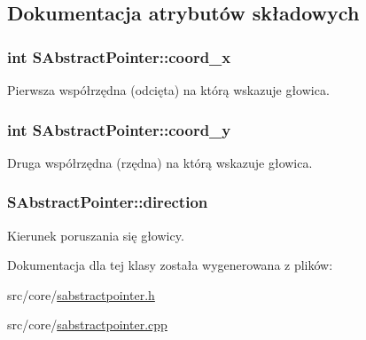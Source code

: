 \subsection{Dokumentacja atrybutów składowych}
\hypertarget{classSAbstractPointer_f4a22efc5fe4922cfe61ac8d849d6849}{
\subsubsection[{coord\_\-x}]{\setlength{\rightskip}{0pt plus 5cm}int {\bf SAbstractPointer::coord\_\-x}}}
\label{classSAbstractPointer_f4a22efc5fe4922cfe61ac8d849d6849}


Pierwsza współrzędna (odcięta) na którą wskazuje głowica. \hypertarget{classSAbstractPointer_8804aa2589dc17c401c438a2f4a1c489}{
\subsubsection[{coord\_\-y}]{\setlength{\rightskip}{0pt plus 5cm}int {\bf SAbstractPointer::coord\_\-y}}}
\label{classSAbstractPointer_8804aa2589dc17c401c438a2f4a1c489}


Druga współrzędna (rzędna) na którą wskazuje głowica. \hypertarget{classSAbstractPointer_6e8b50c6806f43a8b29596c8899db4f2}{
\subsubsection[{direction}]{ {\bf SAbstractPointer::direction}}}
\label{classSAbstractPointer_6e8b50c6806f43a8b29596c8899db4f2}


Kierunek poruszania się głowicy. 

Dokumentacja dla tej klasy została wygenerowana z plików:\begin{CompactItemize}
\item 
src/core/\hyperlink{sabstractpointer_8h}{sabstractpointer.h}\item 
src/core/\hyperlink{sabstractpointer_8cpp}{sabstractpointer.cpp}\end{CompactItemize}
